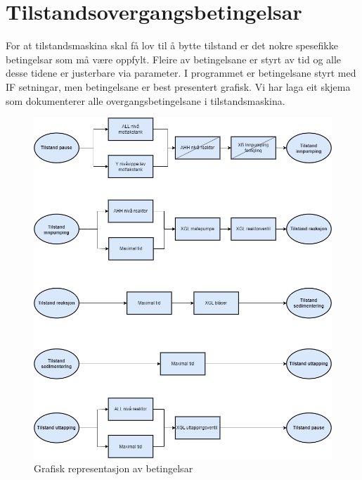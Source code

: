 \section{Tilstandsovergangsbetingelsar}
\thispagestyle{fancy}

For at tilstandsmaskina skal få lov til å bytte tilstand er det nokre spesefikke betingelsar som må være oppfylt.
Fleire av betingelsane er styrt av tid og alle desse tidene er justerbare via parameter. \newline
I programmet er betingelsane styrt med IF setningar, men betingelsane er best presentert grafisk.
Vi har laga eit skjema som dokumenterer alle overgangsbetingelsane i tilstandsmaskina. \newline \newline

\begin{figure}[htbp]
    \centering
    \includegraphics[scale=0.5]{Figurar/Tilstandsovergang.drawio.png}
    \caption{Grafisk representasjon av betingelsar}\label{fig:Tilstandsovergangsbetingelsar}
\end{figure}

\newpage